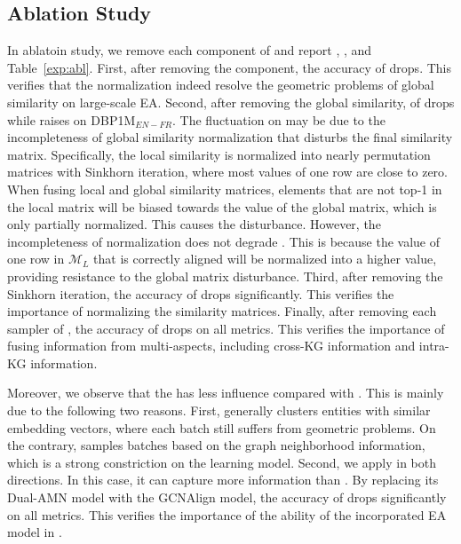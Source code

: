 \subsection{Ablation Study}\label{sec:ablation}
In ablatoin study, we remove 
each component of \ClusterEA{} and report \HitOne{}, \HitTen{}, and \MRR{} Table~\ref{exp:abl}.
First, after removing the \SparseCSLS{} component, the accuracy of \ClusterEA{} drops. This verifies that the \SparseCSLS{} normalization indeed resolve the geometric problems of global similarity on large-scale EA. 
Second, after removing the global similarity, \HitOne{} of \ClusterEA{} drops while \HitTen{} raises on DBP1M$_{EN-FR}$. The fluctuation on \HitTen{} may be due to the incompleteness of global similarity normalization
that disturbs the final similarity matrix. 
Specifically, 
the local similarity is normalized into nearly permutation matrices with Sinkhorn iteration, where most values of one row are close to zero. 
When fusing local and global similarity matrices, elements that are not top-1 in the local matrix will be biased towards the value of the global matrix, which is only partially normalized.
This causes the disturbance.
However,
the incompleteness of normalization does not degrade \HitOne{}. This is because the value of one row in $\mathcal{M}_{L}$ that is correctly aligned will be normalized into a higher value, providing resistance to the global matrix disturbance. 
Third, after removing the Sinkhorn iteration,  the accuracy of \ClusterEA{} drops significantly. This verifies the importance of normalizing the similarity matrices. Finally, after removing each sampler of \Sampling{},  the accuracy of \ClusterEA{} drops on all metrics. This verifies the importance of fusing information from multi-aspects, including cross-KG information and intra-KG information.

Moreover, we observe that the \KMeans{} has less influence compared with \MetisGCN{}. This is mainly due to the following two reasons. First, \KMeans{} generally clusters entities with similar embedding vectors, where each batch still suffers from geometric problems. On the contrary,  \MetisGCN{} samples batches based on the graph neighborhood information, which is a strong constriction on the learning model. Second, we apply \MetisGCN{} in both directions. In this case, it can capture more information than \KMeans{}.
By replacing its Dual-AMN model with the GCNAlign model, the accuracy of \ClusterEA{} drops significantly on all metrics. This verifies the importance of the ability of the incorporated EA model in \ClusterEA{}.

